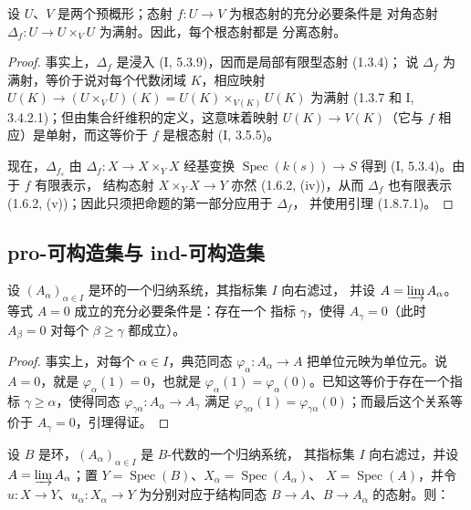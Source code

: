 \begin{lemma}[1.8.7.1]
\label{IV.1.8.7.1-fr}
设 $U$、$V$ 是两个预概形；态射 $f:U\to V$ 为根态射的充分必要条件是
对角态射 $\Delta_f:U\to U\times_VU$ 为满射。因此，每个根态射都是
分离态射。
\end{lemma}

\begin{proof}
事实上，$\Delta_f$ 是浸入 (I, 5.3.9)，因而是局部有限型态射 (1.3.4)；
说 $\Delta_f$ 为满射，等价于说对每个代数闭域 $K$，相应映射
$U(K)\to(U\times_VU)(K)=U(K)\times_{V(K)}U(K)$ 为满射
(1.3.7 和 I, 3.4.2.1)；但由集合纤维积的定义，这意味着映射
$U(K)\to V(K)$（它与 $f$ 相应）是单射，而这等价于 $f$ 是根态射
(I, 3.5.5)。

现在，$\Delta_{f_s}$ 由 $\Delta_f:X\to X\times_YX$ 经基变换
$\operatorname{Spec}(k(s))\to S$ 得到 (I, 5.3.4)。由于 $f$ 有限表示，
结构态射 $X\times_YX\to Y$ 亦然 (1.6.2, (iv))，从而 $\Delta_f$
也有限表示 (1.6.2, (v))；因此只须把命题的第一部分应用于 $\Delta_f$，
并使用引理 (1.8.7.1)。
\end{proof}

\subsection{pro-可构造集与 ind-可构造集}
\label{subsection:IV.1.9-fr}

\begin{lemma}[1.9.1]
\label{IV.1.9.1-fr}
设 $(A_\alpha)_{\alpha\in I}$ 是环的一个归纳系统，其指标集 $I$ 向右滤过，
并设 $A=\varinjlim A_\alpha$。等式 $A=0$ 成立的充分必要条件是：存在一个
指标 $\gamma$，使得 $A_\gamma=0$（此时 $A_\beta=0$ 对每个
$\beta\geq\gamma$ 都成立）。
\end{lemma}

\begin{proof}
事实上，对每个 $\alpha\in I$，典范同态
$\varphi_\alpha:A_\alpha\to A$ 把单位元映为单位元。说 $A=0$，就是
$\varphi_\alpha(1)=0$，也就是
$\varphi_\alpha(1)=\varphi_\alpha(0)$。已知这等价于存在一个指标
$\gamma\geq\alpha$，使得同态
$\varphi_{\gamma\alpha}:A_\alpha\to A_\gamma$ 满足
$\varphi_{\gamma\alpha}(1)=\varphi_{\gamma\alpha}(0)$；而最后这个关系等价于
$A_\gamma=0$，引理得证。
\end{proof}

\begin{proposition}[1.9.2]
\label{IV.1.9.2-fr}
设 $B$ 是环，$(A_\alpha)_{\alpha\in I}$ 是 $B$-代数的一个归纳系统，
其指标集 $I$ 向右滤过，并设 $A=\varinjlim A_\alpha$；置
$Y=\operatorname{Spec}(B)$、$X_\alpha=\operatorname{Spec}(A_\alpha)$、
$X=\operatorname{Spec}(A)$，并令 $u:X\to Y$、$u_\alpha:X_\alpha\to Y$
为分别对应于结构同态 $B\to A$、$B\to A_\alpha$ 的态射。则：
\end{proposition}

